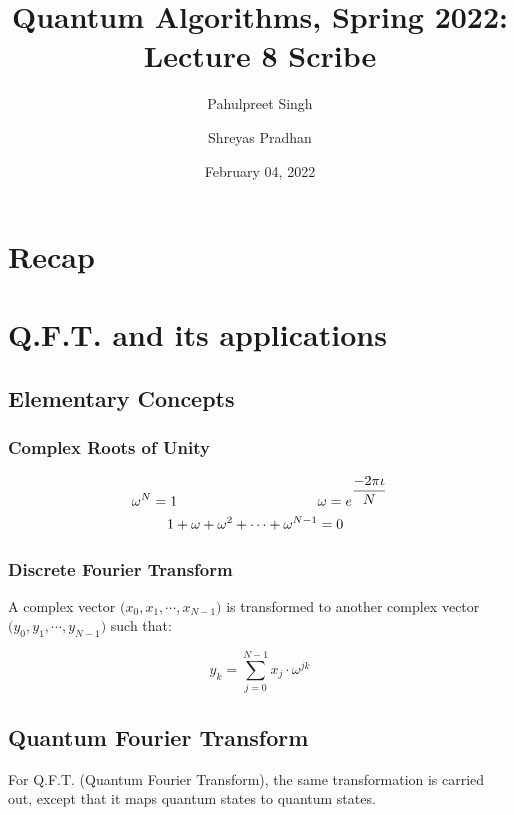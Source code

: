 \documentclass[11.5pt, paper=a4]{article}
\title{Quantum Algorithms, Spring 2022: Lecture 8 Scribe}
\author{Pahulpreet Singh \and Shreyas Pradhan}
\date{February 04, 2022}
\theoremstyle{definition}
\numberwithin{theorem}{section}
\begin{document}
\maketitle

\section{Recap}


\section{Q.F.T. and its applications}

\subsection{Elementary Concepts}

\subsubsection{Complex Roots of Unity}

\begin{align*}
    \omega^N = 1  \hspace{100px}                  & \omega = e^{\displaystyle \frac{-2\pi\iota}{N}} \\
    1 + \omega + \omega^2 + \cdots + \omega^{N-1} & = 0
\end{align*}


\subsubsection{Discrete Fourier Transform}

A complex vector $\big(x_0, x_1, \cdots, x_{N-1} \big)$ is transformed to another complex vector
$\big( y_0, y_1, \cdots, y_{N-1} \big)$ such that:

\begin{equation}
    y_k = \sum_{j=0}^{N-1} x_j \cdot \omega^{jk}
\end{equation}

\subsection{Quantum Fourier Transform}

For Q.F.T. (Quantum Fourier Transform), the same transformation is carried out, except that it maps
quantum states to quantum states.
\end{document}
